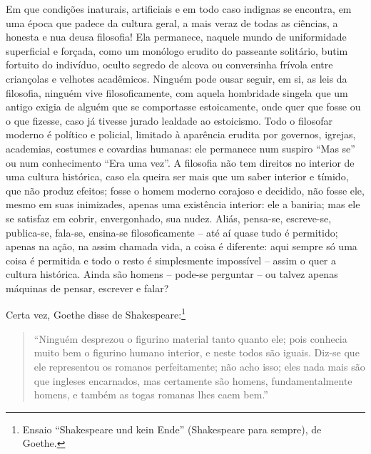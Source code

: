 Em que condições inaturais, artificiais e em todo caso indignas se
encontra, em uma época que padece da cultura geral, a mais veraz de
todas as ciências, a honesta e nua deusa filosofia! Ela permanece,
naquele mundo de uniformidade superficial e forçada, como um monólogo
erudito do passeante solitário, butim fortuito do indivíduo, oculto
segredo de alcova ou conversinha frívola entre criançolas e velhotes
acadêmicos. Ninguém pode ousar seguir, em si, as leis da filosofia,
ninguém vive filosoficamente, com aquela hombridade singela que um
antigo exigia de alguém que se comportasse estoicamente, onde quer que
fosse ou o que fizesse, caso já tivesse jurado lealdade ao estoicismo.\label{lealdadeaoestoicismo}
Todo o filosofar moderno é político e policial, limitado à aparência
erudita por governos, igrejas, academias, costumes e covardias humanas:
ele permanece num suspiro ``Mas se'' ou num conhecimento ``Era uma
vez''. A filosofia não tem direitos no interior de uma cultura
histórica, caso ela queira ser mais que um saber interior e tímido, que
não produz efeitos; fosse o homem moderno corajoso e decidido, não fosse
ele, mesmo em suas inimizades, apenas uma existência interior: ele a
baniria; mas ele se satisfaz em cobrir, envergonhado, sua nudez. Aliás,
pensa-se, escreve-se, publica-se, fala-se, ensina-se filosoficamente --
até aí quase tudo é permitido; apenas na ação, na assim chamada vida, a
coisa é diferente: aqui sempre só uma coisa é permitida e todo o resto é
simplesmente impossível -- assim o quer a cultura histórica. Ainda são
homens -- pode-se perguntar -- ou talvez apenas máquinas de pensar, escrever
e falar?

Certa vez, Goethe disse de Shakespeare:\footnote{Ensaio ``Shakespeare und
  kein Ende'' (Shakespeare para sempre), de Goethe.} 

\begin{quote}
``Ninguém desprezou o figurino material tanto quanto ele; pois conhecia muito bem
o figurino humano interior, e neste todos são iguais. Diz-se que ele
representou os romanos perfeitamente; não acho isso; eles nada mais são
que ingleses encarnados, mas certamente são homens, fundamentalmente
homens, e também as togas romanas lhes caem bem.'' 
\end{quote}

